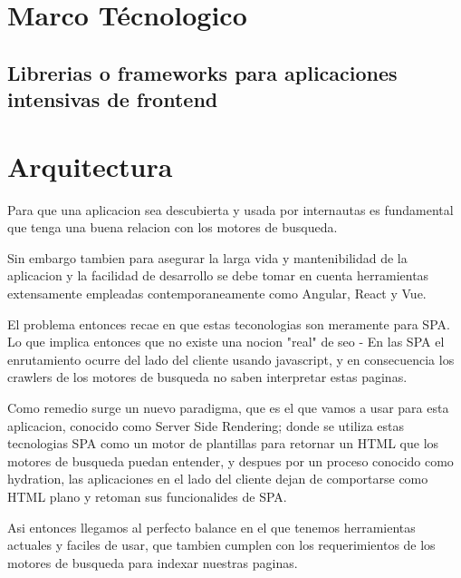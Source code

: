 \section{Marco Técnologico}




\subsection{Librerias o frameworks para aplicaciones intensivas de frontend }

\section{Arquitectura}

Para que una aplicacion sea descubierta y usada por internautas es fundamental que tenga una buena relacion con los motores de busqueda. 

Sin embargo tambien para asegurar la larga vida y mantenibilidad de la aplicacion y la facilidad de desarrollo se debe tomar en cuenta herramientas extensamente empleadas contemporaneamente como Angular, React y Vue. 

El problema entonces recae en que estas teconologias son meramente para SPA. Lo que implica entonces que no existe una nocion "real" de seo - En las SPA el enrutamiento ocurre del lado del cliente usando javascript, y en consecuencia los crawlers de los motores de busqueda no saben interpretar estas paginas.

Como remedio surge un nuevo paradigma, que es el que vamos a usar para esta aplicacion, conocido como Server Side Rendering; donde se utiliza estas tecnologias SPA como un motor de plantillas para retornar un HTML que los motores de busqueda puedan entender, y despues por un proceso conocido como hydration, las aplicaciones en el lado del cliente dejan de comportarse como HTML plano y retoman sus funcionalides de SPA.

Asi entonces llegamos al perfecto balance en el que tenemos herramientas actuales y faciles de usar, que tambien cumplen con los requerimientos de los motores de busqueda para indexar nuestras paginas. 